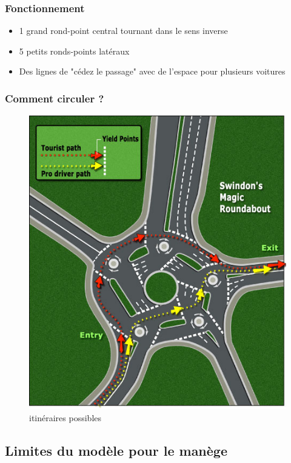 \documentclass[slidetop,11pt]{beamer}
\begin{document}
\begin{frame}
	\frametitle{Fonctionnement}
	\begin{itemize}
		\item 1 grand rond-point central tournant dans le sens inverse
		\item 5 petits ronds-points latéraux
		\item Des lignes de "cédez le passage" avec de l'espace pour plusieurs voitures
	\end{itemize}
\end{frame}

\begin{frame}
	\frametitle{Comment circuler ?}
	\begin{figure}
		\begin{center}
			\includegraphics[scale=0.3]{./images/itin}
			\caption{itinéraires possibles}
		\end{center}
	\end{figure}
\end{frame}

	\subsection{Limites du modèle pour le manège}
	
\end{document}
